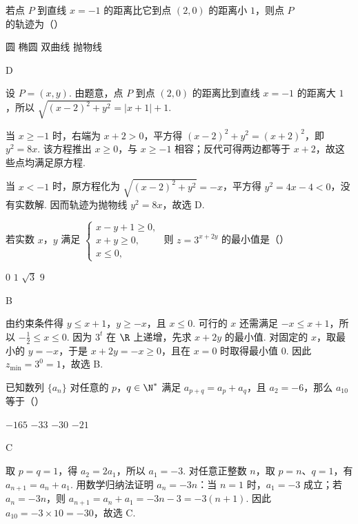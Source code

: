 \begin{problem}
若点 \(P\) 到直线 \(x = -1\) 的距离比它到点 \((2,0)\) 的距离小 \(1\)，则点 \(P\) 的轨迹为（\quad）

\choices
    {圆}
    {椭圆}
    {双曲线}
    {抛物线}

\begin{answer}
D
\end{answer}

\begin{solution}
设 \(P=(x,y)\). 由题意，点 \(P\) 到点 \((2,0)\) 的距离比到直线 \(x=-1\) 的距离大 \(1\)，所以 \(\sqrt{(x-2)^2+y^2}=|x+1|+1\).

当 \(x\geqslant-1\) 时，右端为 \(x+2>0\)，平方得 \((x-2)^2+y^2=(x+2)^2\)，即 \(y^2=8x\). 该方程推出 \(x\geqslant0\)，与 \(x\geqslant-1\) 相容；反代可得两边都等于 \(x+2\)，故这些点均满足原方程.

当 \(x<-1\) 时，原方程化为 \(\sqrt{(x-2)^2+y^2}=-x\)，平方得 \(y^2=4x-4<0\)，没有实数解. 因而轨迹为抛物线 \(y^2=8x\)，故选 D.
\end{solution}
\end{problem}

\begin{problem}
若实数 \(x\)，\(y\) 满足 \(\begin{cases}
x - y + 1 \geqslant 0,\\
x + y \geqslant 0,\\
x \leqslant 0,
\end{cases}\) 则 \(z = 3^{x + 2y}\) 的最小值是（\quad）

\choices
    {\(0\)}
    {\(1\)}
    {\(\sqrt{3}\)}
    {\(9\)}

\begin{answer}
B
\end{answer}

\begin{solution}
由约束条件得 \(y\leqslant x+1\)，\(y\geqslant-x\)，且 \(x\leqslant0\). 可行的 \(x\) 还需满足 \(-x\leqslant x+1\)，所以 \(-\frac12\leqslant x\leqslant0\). 因为 \(3^t\) 在 \(\R\) 上递增，先求 \(x+2y\) 的最小值. 对固定的 \(x\)，取最小的 \(y=-x\)，于是 \(x+2y=-x\geqslant0\)，且在 \(x=0\) 时取得最小值 \(0\). 因此 \(z_{\min}=3^0=1\)，故选 B.
\end{solution}
\end{problem}

\begin{problem}
已知数列 \(\{a_{n}\}\) 对任意的 \(p\)，\(q \in \N^{*}\) 满足 \(a_{p + q} = a_p + a_q\)，且 \(a_2 = -6\)，那么 \(a_{10}\) 等于（\quad）

\choices
    {\(-165\)}
    {\(-33\)}
    {\(-30\)}
    {\(-21\)}

\begin{answer}
C
\end{answer}

\begin{solution}
取 \(p=q=1\)，得 \(a_2=2a_1\)，所以 \(a_1=-3\). 对任意正整数 \(n\)，取 \(p=n\)、\(q=1\)，有 \(a_{n+1}=a_n+a_1\). 用数学归纳法证明 \(a_n=-3n\)：当 \(n=1\) 时，\(a_1=-3\) 成立；若 \(a_n=-3n\)，则 \(a_{n+1}=a_n+a_1=-3n-3=-3(n+1)\). 因此 \(a_{10}=-3\times10=-30\)，故选 C.
\end{solution}
\end{problem}

